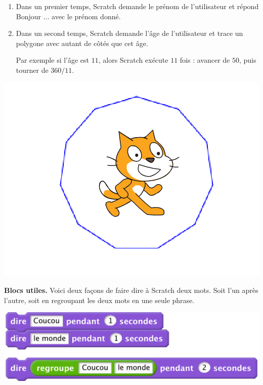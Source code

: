 \documentclass[class=report,crop=false, 12pt]{standalone}
\begin{document}
\begin{activite}
\sauteligne

\begin{enumerate}
  \item Dans un premier temps, Scratch demande le prénom de l'utilisateur et répond \og Bonjour ...\fg{} avec le prénom donné.
  
  \item Dans un second temps, Scratch demande l'âge de l'utilisateur et trace un polygone avec autant de côtés que cet âge.
  
  Par exemple si l'âge est $11$, alors Scratch exécute $11$ fois : avancer de $50$, puis tourner de $360/11$.

\end{enumerate}
\begin{center}
  \includegraphics[scale=\scaleecran]{ecran-05-ex3} 
\end{center}



\textbf{Blocs utiles.} Voici deux façons de faire dire à Scratch deux mots. Soit l'un après l'autre, soit en regroupant les deux mots en une seule phrase.
\begin{center}
  \includegraphics[scale=\scalebloc]{bloc-05-ex3}
\end{center}

\end{activite}
\end{document}

